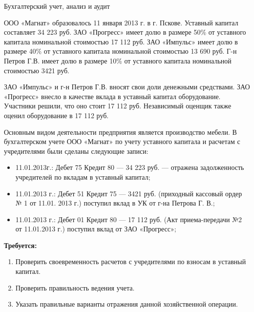 \documentclass[
	11pt,
	a4paper,
	]
	{article}
\begin{document}
\begin{center}\lowGE * \end{center}
\newpage


 {Бухгалтерский учет, анализ и аудит}
\prGE

	ООО «Магнат» образовалось 11 января 2013 г. в г. Пскове. Уставный капитал составляет 34 223 руб. ЗАО «Прогресс» имеет долю в размере 50\% от уставного капитала номинальной стоимостью 17 112 руб. ЗАО «Импульс» имеет долю в размере 40\% от уставного капитала номинальной стоимостью 13 690 руб. Г-н Петров Г.В. имеет долю в размере 10\% от уставного капитала номинальной стоимостью 3421 руб.
	\medskip

	ЗАО «Импульс» и г-н Петров Г.В. вносят свои доли денежными средствами. ЗАО «Прогресс» внесло в качестве вклада в уставный капитал оборудование. Участники решили, что оно стоит 17 112 руб. Независимый оценщик также оценил оборудование в 17 112 руб. 
	\medskip

	Основным видом деятельности предприятия является производство мебели. В бухгалтерском учете ООО «Магнат» по учету уставного капитала и расчетам с учредителями были сделаны следующие записи:

	\begin{itemize}
		\item 11.01.2013г.: Дебет 75 Кредит 80 — 34 223 руб. — отражена задолженность учредителей по вкладам в уставный капитал;
		\item 11.01.2013 г.: Дебет 51 Кредит 75 — 3421 руб. (приходный кассовый ордер № 1 от 11.01. 2013 г.) поступил вклад в УК от г-на Петрова Г. В.;
		\item 11.01.2013 г.: Дебет 01 Кредит 80 — 17 112 руб. (Акт приема-передачи №2 от 11.01.2013 г.) поступил вклад от ЗАО «Прогресс»;
	\end{itemize}

	\textbf{Требуется:}
	\begin{enumerate}
		\item Проверить своевременность расчетов с учредителями по взносам в уставный капитал. 
		\item Проверить правильность ведения учета.
		\item Указать правильные варианты отражения данной хозяйственной операции.
	\end{enumerate}

\begin{center}\lowGE * \end{center}
\newpage
\end{document}
